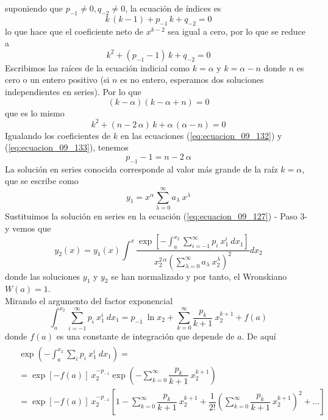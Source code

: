 suponiendo que $p_{-1} \neq 0, q_{-2} \neq 0$, la ecuación de índices es
\[ k \, (k - 1) + p_{-1} \, k + q_{-2} = 0 \]
lo que hace que el coeficiente neto de $x^{k-2}$ sea igual a cero, por lo que se reduce a
\begin{equation}
k^{2} + (p_{-1} - 1) \, k + q_{-2} = 0
\label{eq:ecuacion_09_132}
\end{equation}
Escribimos las raíces de la ecuación indicial como $k = \alpha$ y $k= \alpha -n$ donde $n$ es cero o un entero positivo (si $n$ es no entero, esperamos dos soluciones independientes en series). Por lo que
\begin{equation}
(k - \alpha)(k - \alpha + n) = 0
\label{eq:ecuacion_09_133}
\end{equation}
que es lo mismo
\[ k^{2} + (n - 2 \, \alpha) \, k + \alpha \, (\alpha - n) = 0\]
Igualando los coeficientes de $k$ en las ecuaciones (\ref{eq:ecuacion_09_132}) y (\ref{eq:ecuacion_09_133}), tenemos
\begin{equation}
p_{-1} -1 = n - 2 \: \alpha
\label{eq:ecuacion_09_134}
\end{equation}
La solución en series conocida corresponde al valor más grande de la raíz $k=\alpha$, que se escribe como
\[ y_{1} =  x^{\alpha} \sum_{\lambda=0}^{\infty} a_{\lambda} \: x^{\lambda} \]
Sustituimos la solución en series en la ecuación (\ref{eq:ecuacion_09_127}) - Paso 3- y vemos que
\begin{equation}
y_{2}(x) = y_{1} (x) \int^{x} \dfrac{\exp \left[ - \int_{a}^{x_{2}} \sum_{i=-1}^{\infty} p_{i} \: x^{i}_{1} \: d x_{1} \right] }{x_{2}^{2 \, \alpha} \left( \sum_{\lambda=0}^\infty a_{\lambda} \: x_{2}^{\lambda} \right)^{2} } dx_{2}
\label{eq:ecuacion_09_135}
\end{equation}
donde las soluciones $y_{1}$ y $y_{2}$ se han normalizado y por tanto, el Wronskiano $W(a)=1$. 
\\
Mirando el argumento del factor exponencial
\begin{equation}
\int_{a}^{x_{2}} \sum_{i=-1}^{\infty} p_{i} \: x_{1}^{i} \: dx_{1} = p_{-1} \: \ln x_{2} + \sum_{k=0}^{\infty} \dfrac{p_{k}}{k+1} \: x_{2}^{k+1} + f(a)
\label{eq:ecuacion_09_136}
\end{equation}
donde $f(a)$ es una constante de integración que depende de $a$. De aquí
\begin{align}
\begin{aligned}
&{}\exp \left( - \int_{a}^{x_{2}} \sum_{i} p_{i} \: x_{1}^{i} \: dx_{1} \right) =  \\
&= \exp [ - f(a) ] \: x_{2}^{-p_{-1}} \exp \left( - \sum_{k=0}^{\infty} \dfrac{p_{k}}{k+1} \: x_{2}^{k+1} \right)  \\
&= \exp [ - f(a) ] \: x_{2}^{-p_{-1}} \left[ 1 - \sum_{k=0}^{\infty} \dfrac{p_{k}}{k+1} \: x_{2}^{k+1} + \dfrac{1}{2!} \left( \sum_{k=0}^{\infty} \dfrac{p_{k}}{k+1} \: x_{2}^{k+1} \right)^{2} + \ldots \right]
\end{aligned}
\label{eq:ecuacion_09_137}
\end{align}
